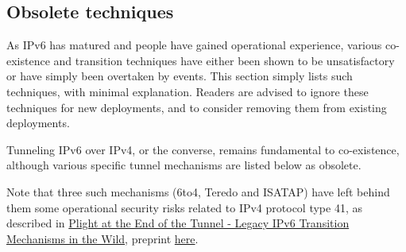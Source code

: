 \documentclass[
]{article}
\begin{document}
\pagebreak

\subsection{Obsolete techniques}\label{obsolete-techniques}

As IPv6 has matured and people have gained operational experience,
various co-existence and transition techniques have either been shown to
be unsatisfactory or have simply been overtaken by events. This section
simply lists such techniques, with minimal explanation. Readers are
advised to ignore these techniques for new deployments, and to consider
removing them from existing deployments.

Tunneling IPv6 over IPv4, or the converse, remains fundamental to
co-existence, although various specific tunnel mechanisms are listed
below as obsolete.

Note that three such mechanisms (6to4, Teredo and ISATAP) have left
behind them some operational security risks related to IPv4 protocol
type 41, as described in
\href{https://doi.org/10.1007/978-3-030-72582-2_23}{Plight at the End of
the Tunnel - Legacy IPv6 Transition Mechanisms in the Wild}, preprint
\href{https://dataplane.org/jtk/publications/kgkp-pam-21.pdf}{here}.
\end{document}
